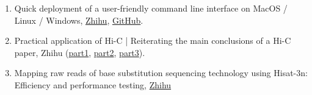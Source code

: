 \begin{enumerate}
    \item Quick deployment of a user-friendly command line interface on MacOS / Linux / Windows,
    \href{https://zhuanlan.zhihu.com/p/648520368}{Zhihu},
    \href{https://github.com/hermanzhaozzzz/.my_shell_envs}{GitHub}.
    \item Practical application of Hi-C | Reiterating the main conclusions of a Hi-C paper,
    Zhihu (\href{https://zhuanlan.zhihu.com/p/542713896}{part1}, 
    \href{https://zhuanlan.zhihu.com/p/543987644}{part2},
    \href{https://zhuanlan.zhihu.com/p/545657147}{part3}).
    \item Mapping raw reads of base substitution sequencing technology using Hisat-3n: Efficiency and performance testing,
    \href{https://zhuanlan.zhihu.com/p/386371449}{Zhihu}
\end{enumerate}